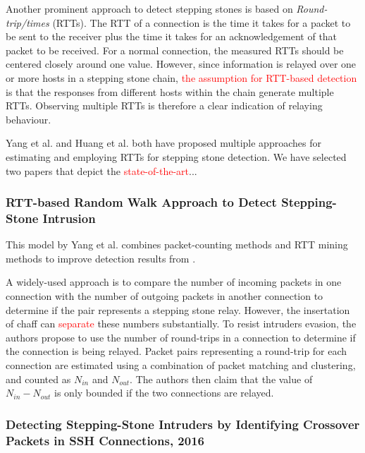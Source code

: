 \documentclass[conference]{IEEEtran}\usepackage[]{graphicx}\usepackage[]{color}
\begin{document}
Another prominent approach to detect stepping stones is based on \textit{Round-trip/times} (RTTs). The RTT of a connection is the time it takes for a packet to be sent to the receiver plus the time it takes for an acknowledgement of that packet to be received. For a normal connection, the measured RTTs should be centered closely around one value. However, since information is relayed over one or more hosts in a stepping stone chain, \textcolor{red}{the assumption for RTT-based detection} is that the responses from different hosts within the chain generate multiple RTTs. Observing multiple RTTs is therefore a clear indication of relaying behaviour.

Yang et al. \cite{yang2015rtt,yang2007mining} and Huang et al. \cite{huang2016detecting,ding2009detecting,huang2007stepping}  both have proposed multiple approaches for estimating and employing RTTs for stepping stone detection. We have selected two papers that depict the \textcolor{red}{state-of-the-art}...

\subsubsection{RTT-based Random Walk Approach to Detect Stepping-Stone Intrusion }


This model by Yang et al. \cite{yang2015rtt} combines packet-counting methods and RTT mining methods to improve detection results from \cite{yang2007mining}. 

A widely-used approach is to compare the number of incoming packets in one connection with the number of outgoing packets in another connection  to determine if the pair represents a stepping stone relay. However, the insertation of chaff can \textcolor{red}{separate} these numbers substantially. 
To resist intruders  evasion,  the authors  propose  to use the  number of  round-trips in  a  connection  to  determine  if  the  connection  is being  relayed.
Packet pairs representing a round-trip for each connection are estimated using a combination of packet matching and clustering, and counted as $N_{in}$ and $N_{out}$. The authors then claim that the value of $N_{in}-N_{out}$ is only bounded if the two connections are relayed.


\subsubsection{Detecting Stepping-Stone Intruders by Identifying Crossover Packets in SSH Connections, 2016}
\end{document}
